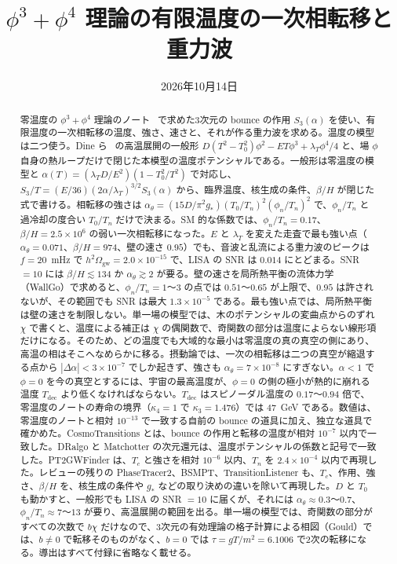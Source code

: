 \documentclass[a4paper,10pt]{ltjsarticle}
\title{$\phi^3+\phi^4$ 理論の有限温度の一次相転移と重力波}
\author{}
\date{2026年10月14日}
\begin{document}
\maketitle

\begin{abstract}
零温度の $\phi^3+\phi^4$ 理論のノート~\cite{phi34note} で求めた3次元の bounce の作用 $S_3(\alpha)$ を使い、有限温度の一次相転移の温度、強さ、速さと、それが作る重力波を求める。温度の模型は二つ使う。Dine ら~\cite{dine92} の高温展開の一般形 $D(T^2-T_0^2)\phi^2-ET\phi^3+\lambda_T\phi^4/4$ と、場 $\phi$ 自身の熱ループだけで閉じた本模型の温度ポテンシャルである。一般形は零温度の模型と $\alpha(T)=(\lambda_TD/E^2)(1-T_0^2/T^2)$ で対応し、$S_3/T=(E/36)(2\alpha/\lambda_T)^{3/2}S_3(\alpha)$ から、臨界温度、核生成の条件、$\beta/H$ が閉じた式で書ける。相転移の強さは $\alpha_\theta=(15D/\pi^2g_*)(T_0/T_n)^2(\phi_n/T_n)^2$ で、$\phi_n/T_n$ と過冷却の度合い $T_0/T_n$ だけで決まる。SM 的な係数では、$\phi_n/T_n=0.17$、$\beta/H=2.5\times10^6$ の弱い一次相転移になった。$E$ と $\lambda_T$ を変えた走査で最も強い点（$\alpha_\theta=0.071$、$\beta/H=974$、壁の速さ $0.95$）でも、音波と乱流による重力波のピークは $f=20$~mHz で $h^2\Omega_{\mathrm{gw}}=2.0\times10^{-15}$ で、LISA の SNR は $0.014$ にとどまる。SNR $=10$ には $\beta/H\lesssim134$ か $\alpha_\theta\gtrsim2$ が要る。壁の速さを局所熱平衡の流体力学（WallGo）で求めると、$\phi_n/T_n=1$〜$3$ の点では $0.51$〜$0.65$ が上限で、$0.95$ は許されないが、その範囲でも SNR は最大 $1.3\times10^{-5}$ である。最も強い点では、局所熱平衡は壁の速さを制限しない。単一場の模型では、木のポテンシャルの変曲点からのずれ $\chi$ で書くと、温度による補正は $\chi$ の偶関数で、奇関数の部分は温度によらない線形項だけになる。そのため、どの温度でも大域的な最小は零温度の真の真空の側にあり、高温の相はそこへなめらかに移る。摂動論では、一次の相転移は二つの真空が縮退する点から $|\Delta\alpha|<3\times10^{-7}$ でしか起きず、強さも $\alpha_\theta=7\times10^{-8}$ にすぎない。$\alpha<1$ で $\phi=0$ を今の真空とするには、宇宙の最高温度が、$\phi=0$ の側の極小が熱的に崩れる温度 $T_{\mathrm{dec}}$ より低くなければならない。$T_{\mathrm{dec}}$ はスピノーダル温度の $0.17$〜$0.94$ 倍で、零温度のノートの寿命の境界（$\kappa_4=1$ で $\kappa_3=1.476$）では $47$~GeV である。数値は、零温度のノートと相対 $10^{-13}$ で一致する自前の bounce の道具に加え、独立な道具で確かめた。CosmoTransitions とは、bounce の作用と転移の温度が相対 $10^{-7}$ 以内で一致した。DRalgo と Matchotter の次元還元は、温度ポテンシャルの係数と記号で一致した。PT2GWFinder は、$T_c$ と強さを相対 $10^{-6}$ 以内、$T_n$ を $2.4\times10^{-4}$ 以内で再現した。レビューの残りの PhaseTracer2、BSMPT、TransitionListener も、$T_c$、作用、強さ、$\beta/H$ を、核生成の条件や $g_*$ などの取り決めの違いを除いて再現した。$D$ と $T_0$ も動かすと、一般形でも LISA の SNR $=10$ に届くが、それには $\alpha_\theta\approx0.3$〜$0.7$、$\phi_n/T_n\approx7$〜$13$ が要り、高温展開の範囲を出る。単一場の模型では、奇関数の部分がすべての次数で $b\chi$ だけなので、3次元の有効理論の格子計算による相図（Gould）では、$b\ne0$ で転移そのものがなく、$b=0$ では $\tau=gT/m^2=6.1006$ で2次の転移になる。導出はすべて付録に省略なく載せる。
\end{abstract}
\end{document}
